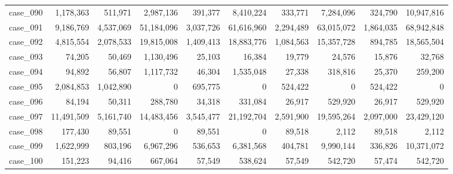 \begin{footnotesize}
\begin{longtable}{l r rr rr rr rr}
case\_090 & 1{,}178{,}363 & 511{,}971 & 2{,}987{,}136 & 391{,}377 & 8{,}410{,}224 & 333{,}771 & 7{,}284{,}096 & 324{,}790 & 10{,}947{,}816 \\
case\_091 & 9{,}186{,}769 & 4{,}537{,}069 & 51{,}184{,}096 & 3{,}037{,}726 & 61{,}616{,}960 & 2{,}294{,}489 & 63{,}015{,}072 & 1{,}864{,}035 & 68{,}942{,}848 \\
case\_092 & 4{,}815{,}554 & 2{,}078{,}533 & 19{,}815{,}008 & 1{,}409{,}413 & 18{,}883{,}776 & 1{,}084{,}563 & 15{,}357{,}728 & 894{,}785 & 18{,}565{,}504 \\
case\_093 & 74{,}205 & 50{,}469 & 1{,}130{,}496 & 25{,}103 & 16{,}384 & 19{,}779 & 24{,}576 & 15{,}876 & 32{,}768 \\
case\_094 & 94{,}892 & 56{,}807 & 1{,}117{,}732 & 46{,}304 & 1{,}535{,}048 & 27{,}338 & 318{,}816 & 25{,}370 & 259{,}200 \\
case\_095 & 2{,}084{,}853 & 1{,}042{,}890 & 0 & 695{,}775 & 0 & 524{,}422 & 0 & 524{,}422 & 0 \\
case\_096 & 84{,}194 & 50{,}311 & 288{,}780 & 34{,}318 & 331{,}084 & 26{,}917 & 529{,}920 & 26{,}917 & 529{,}920 \\
case\_097 & 11{,}491{,}509 & 5{,}161{,}740 & 14{,}483{,}456 & 3{,}545{,}477 & 21{,}192{,}704 & 2{,}591{,}900 & 19{,}595{,}264 & 2{,}097{,}000 & 23{,}429{,}120 \\
case\_098 & 177{,}430 & 89{,}551 & 0 & 89{,}551 & 0 & 89{,}518 & 2{,}112 & 89{,}518 & 2{,}112 \\
case\_099 & 1{,}622{,}999 & 803{,}196 & 6{,}967{,}296 & 536{,}653 & 6{,}381{,}568 & 404{,}781 & 9{,}990{,}144 & 336{,}826 & 10{,}371{,}072 \\
case\_100 & 151{,}223 & 94{,}416 & 667{,}064 & 57{,}549 & 538{,}624 & 57{,}549 & 542{,}720 & 57{,}474 & 542{,}720 \\
\end{longtable}
\end{footnotesize}
